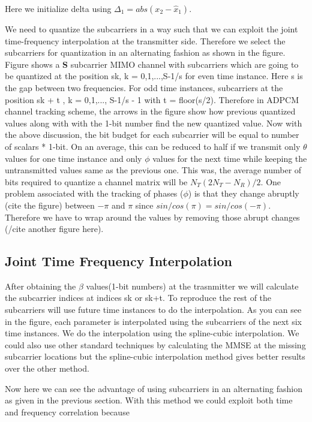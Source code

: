 \documentclass[conference]{IEEEtran}
\begin{document}
Here we initialize delta using $\Delta_1 = abs(x_{2}-\hat{x}_1)$.

We need to quantize the subcarriers in a way such that we can exploit the joint time-frequency interpolation at the transmitter side. Therefore we select the subcarriers for quantization in an alternating fashion as shown in the figure. Figure shows a \textbf{S} subcarrier MIMO channel with subcarriers which are going to be quantized at the position sk, k = 0,1,...,S-1/s for even time instance. Here s is the gap between two frequencies. For odd time instances, subcarriers at the position sk + t , k = 0,1,..., S-1/s - 1 with t = floor(s/2).
Therefore in ADPCM channel tracking scheme, the arrows in the figure show how previous quantized values along with with the 1-bit number find the new quantized value. Now with the above discussion, the bit budget for each subcarrier will be equal to number of scalars * 1-bit. On an average, this can be reduced to half if we transmit only $\theta$ values for one time instance and only $\phi$ values for the next time while keeping the untransmitted values same as the previous one. This was, the average number of bits required to quantize a channel matrix will be $N_{T}(2N_{T} - N_{R})/2$. 
One problem associated with the tracking of phases ($\phi$) is that they change abruptly (cite the figure) between $-\pi$ and $\pi$ since $sin/cos(\pi) = sin/cos(-\pi)$. Therefore we have to wrap around the values by removing those abrupt changes (/cite another figure here).

\subsection{Joint Time Frequency Interpolation}
\label{interp}

After obtaining the $\beta$ values(1-bit numbers) at the trasnmitter we will calculate the subcarrier indices at indices sk or sk+t. To reproduce the rest of the subcarriers will use future time instances to do the interpolation. As you can see in the figure, each parameter is interpolated using the subcarriers of the next six time instances. We do the interpolation using the spline-cubic interpolation. We could also use other standard techniques by calculating the MMSE at the missing subcarrier locations but the spline-cubic interpolation method gives better results over the other method. 

Now here we can see the advantage of using subcarriers in an alternating fashion as given in the previous section. With this method we could exploit both time and frequency correlation because 
\end{document}
